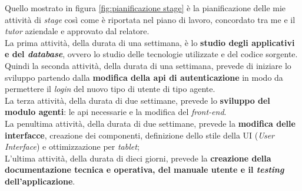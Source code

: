Quello mostrato in figura \ref{fig:pianificazione stage} è la pianificazione delle mie attività di \textit{stage} 
così come è riportata nel piano di lavoro, concordato tra me e il \textit{tutor} aziendale e approvato dal relatore.\\
La prima attività, della durata di una settimana, è lo \textbf{studio degli applicativi e del \textit{database}}, ovvero 
lo studio delle tecnologie utilizzate e del codice sorgente.\\
Quindi la seconda attività, della durata di una settimana, prevede di iniziare lo sviluppo partendo dalla \textbf{modifica 
della \gls{api} di autenticazione} in modo da permettere il \textit{login} del nuovo tipo di utente di tipo agente.\\
La terza attività, della durata di due settimane, prevede lo \textbf{sviluppo del modulo agenti}: le \gls{api} necessarie e la modifica del \textit{front-end}.\\
La penultima attività, della durata di due settimane, prevede la \textbf{modifica delle interfacce}, creazione dei componenti, 
definizione dello stile della UI (\textit{User Interface}) e ottimizzazione per \textit{tablet};\\
L'ultima attività, della durata di dieci giorni, prevede la \textbf{creazione della documentazione tecnica e operativa, 
del manuale utente e il \textit{testing} dell'applicazione}.